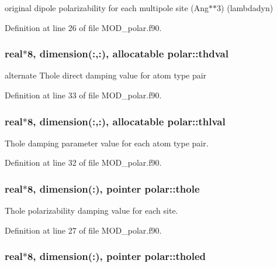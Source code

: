original dipole polarizability for each multipole site (Ang$\ast$$\ast$3) (lambdadyn) 



Definition at line 26 of file M\-O\-D\-\_\-polar.\-f90.

\hypertarget{classpolar_a1e698423d3f909c74679eedcb706b3a0}{
\subsubsection[{thdval}]{\setlength{\rightskip}{0pt plus 5cm}real$\ast$8, dimension(\-:,\-:), allocatable polar\-::thdval}}\label{classpolar_a1e698423d3f909c74679eedcb706b3a0}


alternate Thole direct damping value for atom type pair 



Definition at line 33 of file M\-O\-D\-\_\-polar.\-f90.

\hypertarget{classpolar_a3aac24400014242cf0ce82229938a499}{
\subsubsection[{thlval}]{\setlength{\rightskip}{0pt plus 5cm}real$\ast$8, dimension(\-:,\-:), allocatable polar\-::thlval}}\label{classpolar_a3aac24400014242cf0ce82229938a499}


Thole damping parameter value for each atom type pair. 



Definition at line 32 of file M\-O\-D\-\_\-polar.\-f90.

\hypertarget{classpolar_af6a74c3444e3a1608e79dfc5dc17d15a}{
\subsubsection[{thole}]{\setlength{\rightskip}{0pt plus 5cm}real$\ast$8, dimension(\-:), pointer polar\-::thole}}\label{classpolar_af6a74c3444e3a1608e79dfc5dc17d15a}


Thole polarizability damping value for each site. 



Definition at line 27 of file M\-O\-D\-\_\-polar.\-f90.

\hypertarget{classpolar_a1f36ef991cd55ae13502480f6b4fd3e4}{
\subsubsection[{tholed}]{\setlength{\rightskip}{0pt plus 5cm}real$\ast$8, dimension(\-:), pointer polar\-::tholed}}\label{classpolar_a1f36ef991cd55ae13502480f6b4fd3e4}


